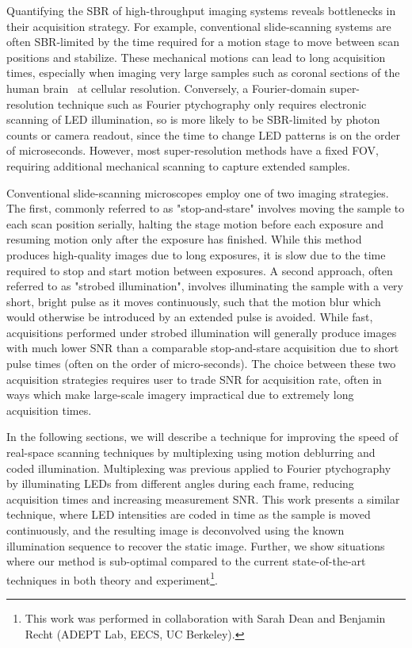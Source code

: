 Quantifying the SBR of high-throughput imaging systems reveals bottlenecks in their acquisition strategy. For example, conventional slide-scanning systems are often SBR-limited by the time required for a motion stage to move between scan positions and stabilize. These mechanical motions can lead to long acquisition times, especially when imaging very large samples such as coronal sections of the human brain~\cite{Grinberg2007} at cellular resolution. 
Conversely, a Fourier-domain super-resolution technique such as Fourier ptychography only requires electronic scanning of LED illumination, so is more likely to be SBR-limited by photon counts or camera readout, since the time to change LED patterns is on the order of microseconds. However, most super-resolution methods have a fixed FOV, requiring additional mechanical scanning to capture extended samples.

Conventional slide-scanning microscopes employ one of two imaging strategies. The first, commonly referred to as "stop-and-stare" involves moving the sample to each scan position serially, halting the stage motion before each exposure and resuming motion only after the exposure has finished. While this method produces high-quality images due to long exposures, it is slow due to the time required to stop and start motion between exposures. A second approach, often referred to as "strobed illumination", involves illuminating the sample with a very short, bright pulse as it moves continuously, such that the motion blur which would otherwise be introduced by an extended pulse is avoided. While fast, acquisitions performed under strobed illumination will generally produce images with much lower SNR than a comparable stop-and-stare acquisition due to short pulse times (often on the order of micro-seconds). The choice between these two acquisition strategies requires user to trade SNR for acquisition rate, often in ways which make large-scale imagery impractical due to extremely long acquisition times.

In the following sections, we will describe a technique for improving the speed of real-space scanning techniques by multiplexing using motion deblurring and coded illumination. Multiplexing was previous applied to Fourier ptychography~\cite{Tian2014} by illuminating LEDs from different angles during each frame, reducing acquisition times and increasing measurement SNR. This work presents a similar technique, where LED intensities are coded in time as the sample is moved continuously, and the resulting image is deconvolved using the known illumination sequence to recover the static image. Further, we show situations where our method is sub-optimal compared to the current state-of-the-art techniques in both theory and experiment\footnote{This work was performed in collaboration with Sarah Dean and Benjamin Recht (ADEPT Lab, EECS, UC Berkeley).}.

